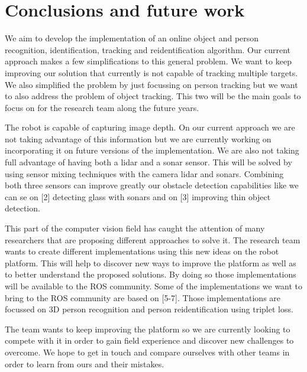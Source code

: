 \section{Conclusions and future work}
We aim to develop the implementation of an online object and person recognition, identification, tracking and reidentification algorithm.
Our current approach makes a few simplifications to this general problem.
We want to keep improving our solution that currently is not capable of tracking multiple targets.
We also simplified the problem by just focussing on person tracking but we want to also address the problem of object tracking.
This two will be the main goals to focus on for the research team along the future years.

The robot is capable of capturing image depth.
On our current approach we are not taking advantage of this information but we are currently working on incorporating it on future versions of the implementation.
We are also not taking full advantage of having both a lidar and a sonar sensor.
This will be solved by using sensor mixing techniques with the camera lidar and sonars.
Combining both three sensors can improve greatly our obstacle detection capabilities like we can se on [2] detecting glass with sonars and on [3] improving thin object detection. 

This part of the computer vision field has caught the attention of many researchers that are proposing different approaches to solve it.
The research team wants to create different implementations using this new ideas on the robot platform.
This will help to discover new ways to improve the platform as well as to better understand the proposed solutions.
By doing so those implementations will be available to the ROS community.
Some of the implementations we want to bring to the ROS community are based on [5-7].
Those implementations are focussed on 3D person recognition and person reidentification using triplet loss.

The team wants to keep improving the platform so we are currently looking to compete with it in order to gain field experience and discover new challenges to overcome.
We hope to get in touch and compare ourselves with other teams in order to learn from ours and their mistakes.

\newpage



\newpage
\robospecs

\nocite{*}

